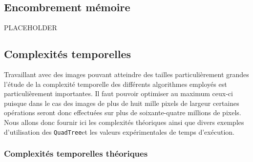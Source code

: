 \documentclass{article}
\newcommand{\info}{\texttt}
\newcommand{\qt}{\info{QuadTree}}
\begin{document}
    \subsection{Encombrement mémoire}
    
    PLACEHOLDER
    
    \subsection{Complexités temporelles}

    Travaillant avec des images pouvant atteindre des tailles particulièrement grandes l'étude de la complexité temporelle des différents algorithmes employés est particulièrement importantes. Il faut pouvoir optimiser au maximum ceux-ci puisque dans le cas des images de plus de huit mille pixels de largeur certaines opérations seront donc effectuées sur plus de soixante-quatre millions de pixels. Nous allons donc fournir ici les complexités théoriques ainsi que divers exemples d'utilisation des \qt et les valeurs expérimentales de temps d'exécution.
    
        \subsubsection{Complexités temporelles théoriques}
        
\end{document}

